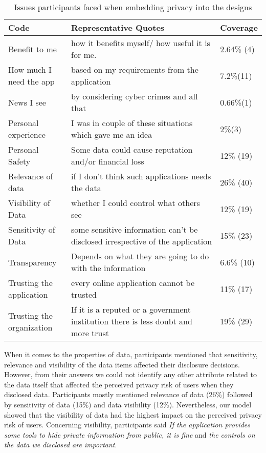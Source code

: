 \documentclass[10pt]{article}
\begin{document}
\begin{center}
\begin{table*}[htbp]
\caption{Issues participants faced when embedding privacy into the designs}
\begin{center}
\begin{adjustbox}{width=1\textwidth}
\begin{tabular}{|p{0.25\linewidth}|p{0.65\linewidth}|p{0.1\linewidth}|}
\hline
Code &  Representative Quotes & Coverage\\
\hline
Benefit to me &how it benefits myself/ how useful it is for me. & 2.64\% (4)\\
\hline
How much I need the app &  based on my requirements from the application & 7.2\%(11)\\
\hline
News I see  & by considering cyber crimes and all that & 0.66\%(1) \\
\hline
Personal experience &  I was in couple of these situations which gave me an idea & 2\%(3) \\
\hline
Personal Safety & Some data could cause reputation and/or financial loss & 12\% (19)\\ 
\hline
Relevance of data& if I don't think such applications needs the data & 26\% (40)\\ 
\hline
Visibility of Data & whether I could control what others see & 12\% (19)\\ 
\hline
Sensitivity of Data & some sensitive information can't be disclosed irrespective of the application
 & 15\% (23)\\ 
\hline
Transparency & Depends on what they are going to do with the information & 6.6\% (10)\\ 
\hline
Trusting the application & every online application cannot be trusted & 11\% (17)\\ 
\hline
Trusting the organization & If it is a reputed or a government institution there is less doubt and more trust & 19\% (29)\\ 
\hline
\end{tabular}
\end{adjustbox}
\end{center}
\end{table*}
\end{center}

When it comes to the properties of data, participants mentioned that sensitivity, relevance and visibility of the data items affected their disclosure decisions. However, from their answers we could not identify any other attribute related to the data itself that affected the perceived privacy risk of users when they disclosed data. Participants mostly mentioned relevance of data (26\%) followed by sensitivity of data (15\%) and data visibility (12\%). Nevertheless, our model showed that the visibility of data had the highest impact on the perceived privacy risk of users. Concerning visibility, participants said \textit{If the application provides some tools to hide private information from public, it is fine} and \textit{the controls on the data we disclosed are important}.
\end{document}
